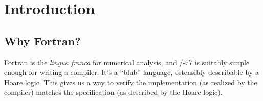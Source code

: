 \section{Introduction}

\subsection{Why Fortran?}
Fortran is the \emph{lingua franca} for numerical analysis, and \FORTRAN/-77
is suitably simple enough for writing a compiler. It's a ``blub''
language, ostensibly describable by a Hoare logic. This gives us a way
to verify the implementation (as realized by the compiler) matches the
specification (as described by the Hoare logic).